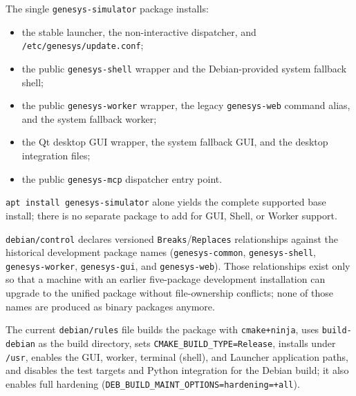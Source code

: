 The single \texttt{genesys-simulator} package installs:
\begin{itemize}
\item the stable launcher, the non-interactive dispatcher, and
  \texttt{/etc/genesys/update.conf};
\item the public \texttt{genesys-shell} wrapper and the Debian-provided
  system fallback shell;
\item the public \texttt{genesys-worker} wrapper, the legacy
  \texttt{genesys-web} command alias, and the system fallback worker;
\item the Qt desktop GUI wrapper, the system fallback GUI, and the desktop
  integration files;
\item the public \texttt{genesys-mcp} dispatcher entry point.
\end{itemize}
\texttt{apt install genesys-simulator} alone yields the complete supported
base install; there is no separate package to add for GUI, Shell, or Worker
support.

\texttt{debian/control} declares versioned \texttt{Breaks}/\texttt{Replaces}
relationships against the historical development package names
(\texttt{genesys-common}, \texttt{genesys-shell}, \texttt{genesys-worker},
\texttt{genesys-gui}, and \texttt{genesys-web}). Those relationships exist only
so that a machine with an earlier five-package development installation can
upgrade to the unified package without file-ownership conflicts; none of those
names are produced as binary packages anymore.

The current \texttt{debian/rules} file builds the package with
\texttt{cmake+ninja}, uses \texttt{build-debian} as the build directory, sets
\texttt{CMAKE\_BUILD\_TYPE=Release}, installs under \texttt{/usr}, enables the
GUI, worker, terminal (shell), and Launcher application paths, and disables
the test targets and Python integration for the Debian build; it also enables
full hardening (\texttt{DEB\_BUILD\_MAINT\_OPTIONS=hardening=+all}).

